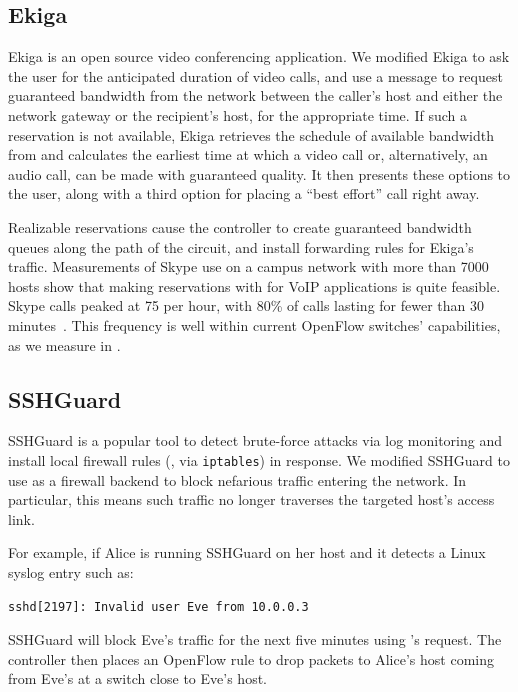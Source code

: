 \subsection{Ekiga}

Ekiga is an open source video conferencing application. %
We modified Ekiga to ask the user for the anticipated duration of
video calls,
and use a  message to request guaranteed bandwidth
from the network between the caller's host and either the network
gateway or the recipient's host, for the appropriate time. If such a
reservation is not available, Ekiga retrieves the schedule of
available bandwidth from \sys and calculates the earliest time at
which a video call or, alternatively, an audio call, can be made
with guaranteed quality. It then presents these options to the
user, along with a third option for placing a ``best effort'' call
right away.

Realizable reservations cause the \sys controller to create
guaranteed bandwidth queues along the path of the circuit, and
install forwarding rules for Ekiga's traffic.
Measurements of Skype use on a campus network with more than 7000
hosts show that making reservations with \sys for VoIP applications
is quite feasible. Skype calls peaked at 75 per hour, with 80\% of
calls lasting for fewer than 30 minutes~\cite{SkypeTraffic}.  This
frequency is well within current OpenFlow switches' capabilities, as
we measure in .\\

\subsection{SSHGuard}
\label{sec:sshguard}

SSHGuard is a popular tool to detect brute-force attacks via log monitoring
and install local firewall rules (\eg, via \verb/iptables/)
in response. We modified SSHGuard to use
\sys as a firewall backend to block nefarious traffic entering
the network. In particular, this means such traffic no longer traverses the
targeted host's access link.

For example, if Alice is running SSHGuard on her host and
it detects a Linux syslog entry such as:

\begin{small}
\begin{verbatim}
sshd[2197]: Invalid user Eve from 10.0.0.3
\end{verbatim}
\end{small}
%
SSHGuard will block Eve's traffic for the next five minutes using
\sys's  request. The \sys controller then places an
OpenFlow rule to drop packets to Alice's host coming from Eve's at a
switch close to Eve's host.

